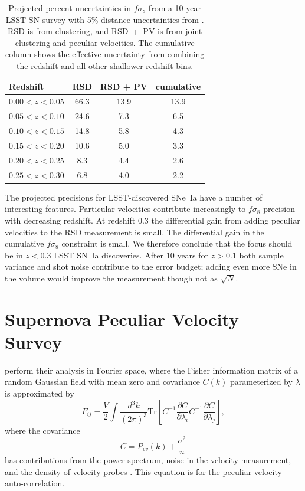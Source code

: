 \documentclass{aastex62}   	%
\begin{document}
\begin{table}
   \centering
   \begin{tabular}{@{} lccc @{}} %
	\hline
	Redshift & RSD & RSD + PV & cumulative\\ \hline
      $0.00<z<0.05$   & 66.3 & 13.9 & 13.9\\
     $0.05<z<0.10$            & 24.6     &  7.3 & 6.5\\
     $0.10<z<0.15$      & 14.8  & 5.8 & 4.3\\
     $0.15<z<0.20$      & 10.6  & 5.0 & 3.3\\
      $0.20<z<0.25$     & 8.3  & 4.4 & 2.6\\
     $0.25<z<0.30$  & 6.8  &  4.0 & 2.2\\
      \hline
   \end{tabular}
   \caption{Projected percent uncertainties in $f\sigma_8$ from a 10-year LSST SN survey with 5\% distance uncertainties from
   \citet{2017ApJ...847..128H}. RSD is from clustering, and RSD~+~PV is from joint clustering and peculiar velocities.
   The cumulative column shows the effective uncertainty from combining the redshift and all other shallower redshift bins.}
   \label{tab:howlett}
\end{table}

The projected precisions for LSST-discovered SNe~Ia have a number of interesting features.  Particular velocities contribute increasingly to
$f\sigma_8$ precision with decreasing redshift.  At redshift 0.3 the differential gain from adding peculiar velocities to the RSD measurement is small.
The differential gain in the cumulative $f\sigma_8$ constraint is small.  We therefore conclude that the focus should be in $z<0.3$ LSST SN~Ia discoveries.
After 10 years for $z>0.1$ both sample variance and shot noise contribute to the error budget; adding even more SNe in the volume would improve
the measurement though not as $\sqrt{N}$.

\section{Supernova Peculiar Velocity Survey}
\citet{2017ApJ...847..128H} perform their analysis in Fourier space, 
where the Fisher information matrix of a random Gaussian field with mean zero and covariance $C(k)$ parameterized by $\lambda$ is
approximated by
\begin{equation}
F_{ij} = \frac{V}{2}\int \frac{d^3k}{(2\pi)^3} \text{Tr}\left[ C^{-1} \frac{\partial C}{\partial \lambda_i} C^{-1}
\frac{\partial C}{\partial \lambda_j} \right],
\end{equation}
where the covariance
\begin{equation}
C = P_{vv}(k) + \frac{\sigma^2}{n}
\label{cov:eq}
\end{equation}
has contributions from the power spectrum, noise in the velocity measurement, and the density of velocity probes
\citep{2017MNRAS.464.2517H}.   This equation is for the peculiar-velocity auto-correlation.
\end{document}
